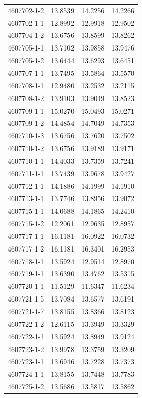 \begin{longtable}{lrrr}
4607702-1-2 & 13.8539 & 14.2256 & 14.2266 \\
4607702-1-1 & 12.8992 & 12.9918 & 12.9502 \\
4607704-1-2 & 13.6756 & 13.8599 & 13.8262 \\
4607705-1-1 & 13.7102 & 13.9858 & 13.9476 \\
4607705-1-2 & 13.6444 & 13.6293 & 13.6451 \\
4607707-1-1 & 13.7495 & 13.5864 & 13.5570 \\
4607708-1-1 & 12.9480 & 13.2532 & 13.2115 \\
4607708-1-2 & 13.9103 & 13.9049 & 13.8523 \\
4607709-1-1 & 15.0270 & 15.0493 & 15.0271 \\
4607709-1-2 & 14.4854 & 14.7049 & 14.7353 \\
4607710-1-3 & 13.6756 & 13.7620 & 13.7502 \\
4607710-1-2 & 13.6756 & 13.9189 & 13.9171 \\
4607710-1-1 & 14.4033 & 13.7359 & 13.7241 \\
4607711-1-1 & 13.7439 & 13.9678 & 13.9427 \\
4607712-1-1 & 14.1886 & 14.1999 & 14.1910 \\
4607713-1-1 & 13.7746 & 13.8956 & 13.9072 \\
4607715-1-1 & 14.0688 & 14.1865 & 14.2410 \\
4607715-1-2 & 12.2061 & 12.9635 & 12.8957 \\
4607717-1-1 & 16.1181 & 16.0922 & 16.0732 \\
4607717-1-2 & 16.1181 & 16.3401 & 16.2953 \\
4607718-1-1 & 13.5924 & 12.9514 & 12.8970 \\
4607719-1-1 & 13.6390 & 13.4762 & 13.5315 \\
4607720-1-1 & 11.5129 & 11.6347 & 11.6234 \\
4607721-1-5 & 13.7084 & 13.6577 & 13.6191 \\
4607721-1-7 & 13.8155 & 13.8366 & 13.8123 \\
4607722-1-2 & 12.6115 & 13.3949 & 13.3329 \\
4607722-1-1 & 13.5924 & 13.8949 & 13.9124 \\
4607723-1-2 & 13.9978 & 13.3759 & 13.3209 \\
4607723-1-1 & 13.6946 & 13.7228 & 13.7373 \\
4607724-1-1 & 13.8155 & 13.7448 & 13.7783 \\
4607725-1-2 & 13.5686 & 13.5817 & 13.5862 \\

\end{longtable}
